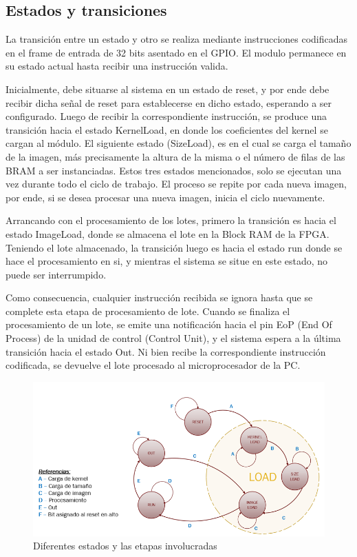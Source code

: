 \subsection{Estados y transiciones}  \label{states_subsecc}

La transición entre un estado y otro se realiza mediante instrucciones codificadas en el frame de entrada de 32 bits asentado en el GPIO. El modulo permanece en su estado actual hasta recibir una instrucción valida.

Inicialmente, debe situarse al sistema en un estado de reset, y por ende debe recibir dicha señal de reset para establecerse en dicho estado, esperando a ser configurado.
Luego de recibir la correspondiente instrucción, se produce una transición hacia el estado KernelLoad, en donde los coeficientes del kernel se cargan al módulo.
El siguiente estado (SizeLoad), es en el cual se carga el tamaño de la imagen, más precisamente la altura de la misma o el número de filas de las BRAM a ser instanciadas.
Estos tres estados mencionados, solo se ejecutan una vez durante todo el ciclo
de trabajo. El proceso se repite por cada nueva imagen, por ende, si se desea
procesar una nueva imagen, inicia el ciclo nuevamente.

Arrancando con el procesamiento de los lotes, primero la transición es hacia el estado ImageLoad, donde se almacena el lote en la Block RAM de la FPGA. 
Teniendo el lote almacenado, la transición luego es hacia el estado run donde se
hace el procesamiento en si, y mientras el sistema se situe en este estado, no
puede ser interrumpido.

Como consecuencia, cualquier instrucción recibida se ignora hasta que se complete esta etapa de procesamiento de lote.
Cuando se finaliza el procesamiento de un lote, se emite una notificación hacia el pin EoP (End Of Process) de la unidad de control (Control Unit), y el sistema espera a la última transición hacia el estado Out. Ni bien recibe la correspondiente instrucción codificada, se devuelve el lote procesado al microprocesador de la PC.

\begin{figure}
\centering
\includegraphics{states_2.png}
\caption{Diferentes estados y las etapas involucradas }
\label{statesfig2}
\end{figure}

